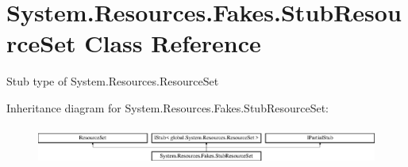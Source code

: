 \hypertarget{class_system_1_1_resources_1_1_fakes_1_1_stub_resource_set}{\section{System.\-Resources.\-Fakes.\-Stub\-Resource\-Set Class Reference}
\label{class_system_1_1_resources_1_1_fakes_1_1_stub_resource_set}
}


Stub type of System.\-Resources.\-Resource\-Set 


Inheritance diagram for System.\-Resources.\-Fakes.\-Stub\-Resource\-Set\-:\begin{figure}[H]
\begin{center}
\leavevmode
\includegraphics[height=1.287356cm]{class_system_1_1_resources_1_1_fakes_1_1_stub_resource_set}
\end{center}
\end{figure}
